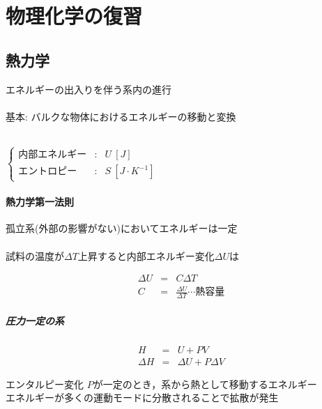 \documentclass{../../../notebook}
\begin{document}

\section*{物理化学の復習}

\subsection{熱力学}

エネルギーの出入りを伴う系内の進行\\\\

基本: バルクな物体におけるエネルギーの移動と変換\\\\

\par

$\left\{\begin{array}{lll}
\mathrm{内部エネルギー} & : & U\ [J]\\
\mathrm{エントロピー} & : & S\ [J\cdot K^{-1}]
\end{array}\right.$

\paragraph{熱力学第一法則}

孤立系(外部の影響がない)においてエネルギーは一定\\\\

試料の温度が$\Delta T$上昇すると内部エネルギー変化$\Delta U$は

\begin{eqnarray*}
  \Delta U &=& C\Delta T \\
  C &=& \frac{\Delta U}{\Delta T} \cdots \mathrm{熱容量}
\end{eqnarray*}

\subparagraph{圧力一定の系}

\begin{eqnarray*}
  H &=& U + PV \\
  \Delta H &=& \Delta U + P\Delta V
\end{eqnarray*}

\hfill エンタルピー変化 \hfill $P$が一定のとき，系から熱として移動するエネルギー\\

エネルギーが多くの運動モードに分散されることで拡散が発生\\
\end{document}
